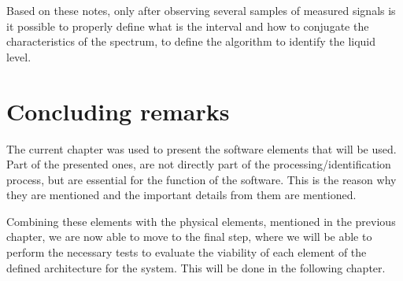 Based on these notes, only after observing several samples of measured signals is it possible to properly define what is the interval and how to conjugate the characteristics of the spectrum, to define the algorithm to identify the liquid level. 
\section{Concluding remarks}
The current chapter was used to present the software elements that will be used. Part of the presented ones, are not directly part of the processing/identification process, but are essential for the function of the software. This is the reason why they are mentioned and the important details from them are mentioned.

Combining these elements with the physical elements, mentioned in the previous chapter, we are now able to move to the final step, where we will be able to perform the necessary tests to evaluate the viability of each element of the defined architecture for the system. This will be done in the following chapter.
